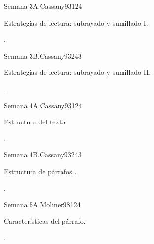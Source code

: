 \begin{syllabus}
\begin{unit}{Semana 3A.}{}{Cassany93}{12}{4}
   \begin{topics}
      \item Estrategias de lectura: subrayado y sumillado I.
   \end{topics}
   \begin{learningoutcomes}
      \item .
   \end{learningoutcomes}
\end{unit}

\begin{unit}{Semana 3B.}{}{Cassany93}{24}{3}
   \begin{topics}
      \item Estrategias de lectura: subrayado y sumillado II.
   \end{topics}

   \begin{learningoutcomes}
      \item .
      \end{learningoutcomes}
\end{unit}

\begin{unit}{Semana 4A.}{}{Cassany93}{12}{4}
   \begin{topics}
      \item Estructura del texto.
   \end{topics}
   \begin{learningoutcomes}
      \item .
   \end{learningoutcomes}
\end{unit}

\begin{unit}{Semana 4B.}{}{Cassany93}{24}{3}
   \begin{topics}
      \item Estructura de párrafos .
   \end{topics}

   \begin{learningoutcomes}
      \item .
      \end{learningoutcomes}
\end{unit}

\begin{unit}{Semana 5A.}{}{Moliner98}{12}{4}
   \begin{topics}
      \item Características del párrafo.
   \end{topics}
   \begin{learningoutcomes}
      \item . 
   \end{learningoutcomes}
\end{unit}


\end{syllabus}
